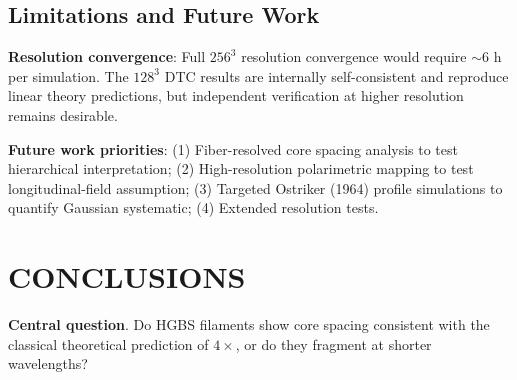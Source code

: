 \documentclass[twocolumn,longtitle,usenatbib]{mnras}
\begin{document}
\subsection{Limitations and Future Work}

\textbf{Resolution convergence}: Full $256^3$ resolution convergence would require $\sim$6 h per simulation. The $128^3$ DTC results are internally self-consistent and reproduce linear theory predictions, but independent verification at higher resolution remains desirable.

\textbf{Future work priorities}: (1) Fiber-resolved core spacing analysis to test hierarchical interpretation; (2) High-resolution polarimetric mapping to test longitudinal-field assumption; (3) Targeted Ostriker (1964) profile simulations to quantify Gaussian systematic; (4) Extended resolution tests.

\section{CONCLUSIONS}

\textbf{Central question}. Do HGBS filaments show core spacing consistent with the classical theoretical prediction of $4\times$, or do they fragment at shorter wavelengths?
\end{document}
